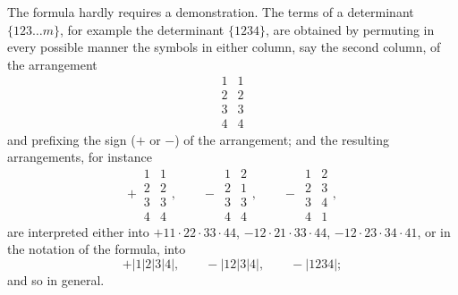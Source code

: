 \documentclass[11pt,a4paper]{article}
\begin{document}
The formula hardly requires a demonstration. The terms of a determinant $\{123\ldots m\}$, for example the determinant $\{1234\}$, are obtained by permuting in every possible manner the symbols in either column, say the second column, of the arrangement
\[
\begin{array}{cc} 1 & 1 \\ 2 & 2 \\ 3 & 3 \\ 4 & 4 \end{array}
\]
and prefixing the sign ($+$ or $-$) of the arrangement; and the resulting arrangements, for instance
\[
+\,\begin{array}{cc}1&1\\2&2\\3&3\\4&4\end{array},\qquad
-\,\begin{array}{cc}1&2\\2&1\\3&3\\4&4\end{array},\qquad
-\,\begin{array}{cc}1&2\\2&3\\3&4\\4&1\end{array},
\]
are interpreted either into $+11\cdot 22\cdot 33\cdot 44$, $-12\cdot 21\cdot 33\cdot 44$, $-12\cdot 23\cdot 34\cdot 41$, or in the notation of the formula, into
\[
+|1|2|3|4|,\qquad -|12|3|4|,\qquad -|1234|;
\]
and so in general.
\end{document}
